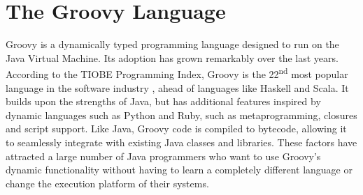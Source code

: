 \documentclass[]{sigplanconf}
\begin{document}
%
%

\section{The Groovy Language\label{groovy}}
Groovy is a dynamically typed programming language designed to run on the Java Virtual Machine.
Its adoption has grown remarkably over the last years.
According to the TIOBE Programming Index, Groovy is the 22\textsuperscript{nd} most popular language in the software industry \cite{tiobe}, ahead of languages like Haskell and Scala. 
It builds upon the strengths of Java, but has additional features inspired by dynamic languages such as Python and Ruby, such as metaprogramming, closures and script support.
Like Java, Groovy code is compiled to bytecode, allowing it to seamlessly integrate with existing Java classes and libraries. 
These factors have attracted a large number of Java programmers who want to use Groovy's dynamic functionality without having to learn a completely different language or change the execution platform of their systems. 

\end{document}
